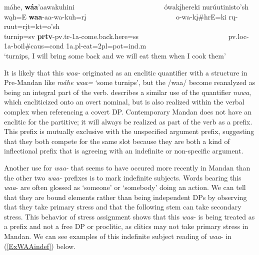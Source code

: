 \begin{exe}
\begin{xlist}
	\item \glll máhe, \textbf{wáa}'aawakuhini ~ ~ ~ ~ ~ ~ ~ ~ ~ ~ ~ ~ ~ ~ ~ ówakįhereki nurúutinisto'sh\\
	wąh=E \textbf{waa}-aa-wa-kuh=rį ~ ~ ~ ~ ~ ~ ~ ~ ~ ~ ~ ~ ~ ~ ~  o-wa-kį\#hrE=ki rų-ruut=rįt=kt=o'sh\\
	\textnormal{turnip}=sv \textbf{prtv}-pv.tr-1a-\textnormal{come.back.here}=ss ~ ~ ~ ~ ~ ~ ~ ~ ~ ~ ~ ~ ~ ~ ~ pv.loc-1a-\textnormal{boil}\#caus=cond 1a.pl-\textnormal{eat}=2pl=pot=ind.m\\
	\glt `turnips, I will bring some back and we will eat them when I cook them' \citep[75]{hollow1973a}
	
	\end{xlist}

\end{exe}

It is likely that this \textit{waa-} originated as an enclitic quantifier with a structure in Pre-Mandan like \textit{máhe waa=} `some turnips', but the /waa/ become reanalyzed as being an integral part of the verb. \citet[480]{park2012} describes a similar use of the quantifier \textit{nuwa}, which encliticized onto an overt nominal, but is also realized within the verbal complex when referencing a covert DP. Contemporary Mandan does not have an enclitic for the partitive; it will always be realized as part of the verb as a prefix. This prefix is mutually exclusive with the unspecified argument prefix, suggesting that they both compete for the same slot because they are both a kind of inflectional prefix that is agreeing with an indefinite or non-specific argument.

\label{SubSubSubSectionIndefiniteSubject}

Another use for \textit{waa-} that seems to have occured more recently in Mandan than the other two \textit{waa-} prefixes is to mark indefinite subjects. Words bearing this \textit{waa}- are often glossed as `someone' or `somebody' doing an action. We can tell that they are bound elements rather than being independent DPs by observing that they take primary stress and that the following stem can take secondary stress. This behavior of stress assignment shows that this \textit{waa}- is being treated as a prefix and not a free DP or proclitic, as clitics may not take primary stress in Mandan. We can see examples of this indefinite subject reading of \textit{waa}- in (\ref{ExWAAindef}) below.



